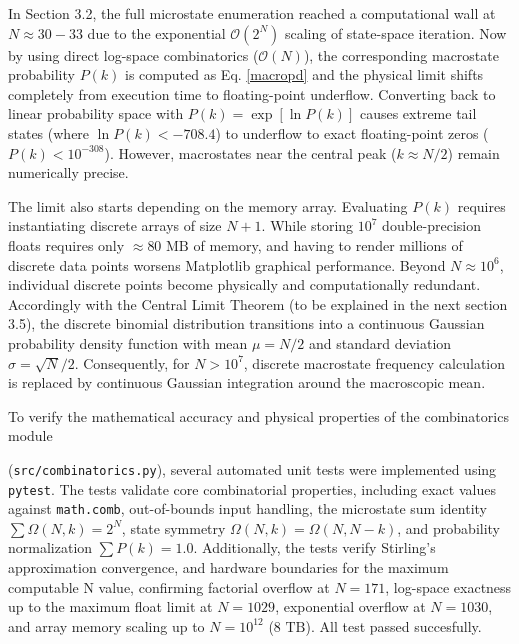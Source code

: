 \documentclass[10pt, a4paper]{article}
\begin{document}
\newline

In Section 3.2, the full microstate enumeration reached a computational wall at $N \approx 30 - 33$ due to the exponential $\mathcal{O}(2^N)$ scaling of state-space iteration. Now by using direct log-space combinatorics ($\mathcal{O}(N)$), the corresponding macrostate probability $P(k)$ is computed as Eq. \ref{macropd} and the physical limit shifts completely from execution time to floating-point underflow. Converting back to linear probability space with $P(k) = \exp[\ln P(k)]$ causes extreme tail states (where $\ln P(k) < -708.4$) to underflow to exact floating-point zeros ($P(k) < 10^{-308}$). However, macrostates near the central peak ($k \approx N/2$) remain numerically precise. 

\newline
The limit also starts depending on the memory array. Evaluating $P(k)$ requires instantiating discrete arrays of size $N + 1$. While storing $10^7$ double-precision floats requires only $\approx 80\text{~MB}$ of memory, and having to render millions of discrete data points worsens Matplotlib graphical performance. Beyond $N \approx 10^6$, individual discrete points become physically and computationally redundant. Accordingly with the Central Limit Theorem (to be explained in the next section 3.5), the discrete binomial distribution transitions into a continuous Gaussian probability density function with mean $\mu = N/2$ and standard deviation $\sigma = \sqrt{N}/2$. Consequently, for $N > 10^7$, discrete macrostate frequency calculation is replaced by continuous Gaussian integration around the macroscopic mean.

\newline

To verify the mathematical accuracy and physical properties of the combinatorics module 

(\texttt{src/combinatorics.py}), several automated unit tests were implemented using \texttt{pytest}. The tests validate core combinatorial properties, including exact values against \texttt{math.comb}, out-of-bounds input handling, the microstate sum identity $\sum \Omega(N, k) = 2^N$, state symmetry $\Omega(N, k) = \Omega(N, N - k)$, and probability normalization $\sum P(k) = 1.0$. Additionally, the tests verify Stirling's approximation convergence, and hardware boundaries for the maximum computable N value, confirming factorial overflow at $N = 171$, log-space exactness up to the maximum float limit at $N = 1029$, exponential overflow at $N = 1030$, and array memory scaling up to $N = 10^{12}$ ($8\text{ TB}$). All test passed succesfully.
\end{document}
